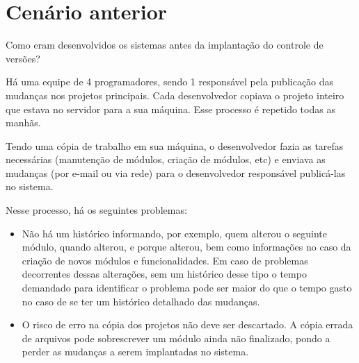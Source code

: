 \section{Cenário anterior}

Como eram desenvolvidos os sistemas antes da implantação do controle de versões?

Há uma equipe de 4 programadores, sendo 1 responsável pela publicação das mudanças nos projetos principais. Cada desenvolvedor copiava o projeto inteiro que estava no servidor para a sua máquina. Esse processo é repetido todas as manhãs.

Tendo uma cópia de trabalho em sua máquina, o desenvolvedor fazia as tarefas necessárias (manutenção de módulos, criação de módulos, etc) e enviava as mudanças (por e-mail ou via rede) para o desenvolvedor responsável publicá-las no sistema.

Nesse processo, há os seguintes problemas:

\begin{itemize}
\item Não há um histórico informando, por exemplo, quem alterou o seguinte módulo, quando alterou, e porque alterou, bem como informações no caso da criação de novos módulos e funcionalidades. Em caso de problemas decorrentes dessas alterações, sem um histórico desse tipo o tempo demandado para identificar o problema pode ser maior do que o tempo gasto no caso de se ter um histórico detalhado das mudanças.

\item O risco de erro na cópia dos projetos não deve ser descartado. A cópia errada de arquivos pode sobrescrever um módulo ainda não finalizado, pondo a perder as mudanças a serem implantadas no sistema.
\end{itemize}

